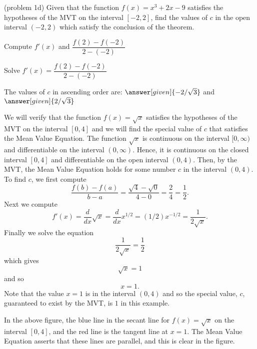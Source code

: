\documentclass{ximera}
\begin{document}
\begin{problem}(problem 1d)
  Given that the function $f(x) = x^3 + 2x -9$ satisfies the hypotheses of the MVT on the
	interval $[-2,2]$, find the values of $c$ in the open interval $(-2,2)$ which satisfy 
	the conclusion of the theorem.
	
    \begin{hint}
      Compute $f'(x)$ and $\dfrac{f(2) - f(-2)}{2-(-2)}$
    \end{hint}
		\begin{hint}
		  Solve $f'(x) = \dfrac{f(2) - f(-2)}{2-(-2)}$
		\end{hint}
		
		The values of $c$ in ascending order are:
		 $\answer[given]{-2/\sqrt 3}$ and $\answer[given]{2/\sqrt 3}$
\end{problem}




\begin{example}[example 2]
We will verify that the function $f(x) = \sqrt x$ satisfies the hypotheses of the MVT
on the interval $[0,4]$ and we will find the special value of $c$ that satisfies the Mean Value Equation.
The function $\sqrt x$ is continuous on the interval $[0, \infty)$  and differentiable on the interval $(0, \infty)$. 
Hence, it is continuous on the closed interval $[0, 4]$ and differentiable on the open interval $(0, 4)$. 
Then, by the MVT,  the Mean Value Equation holds for some number 
$c$ in the interval $(0, 4)$. To find $c$, we first compute
\[\frac{f(b) - f(a)}{b-a} = \frac{\sqrt 4 - \sqrt 0}{4-0} = \frac{2}{4} = \frac{1}{2}.\]
Next we compute
\[f'(x) = \frac{d}{dx} \sqrt x = \frac{d}{dx} x^{1/2} = (1/2)x^{-1/2} = \frac{1}{2\sqrt x}.\]
Finally we solve the equation
\[\frac{1}{2\sqrt x} = \frac{1}{2}\]
which gives
\[\sqrt x = 1\]
and so 
\[ x=1.\]
Note that the value $x = 1$ is in the interval $(0,4)$ and so the special value, $c$, guaranteed to exist by the MVT,
is $1$ in this example.


\begin{image}
\end{image}

In the above figure, the blue line in the secant line for $f(x) = \sqrt x$ on the interval $[0, 4]$, 
and the red line is the tangent line at $x = 1$. The Mean Value Equation asserts that these lines are parallel, and this
is clear in the figure.
\end{example}
\end{document}
